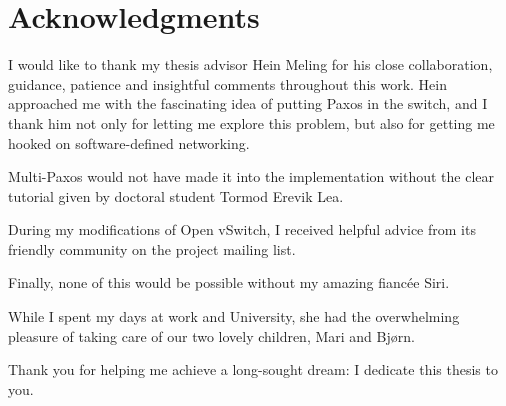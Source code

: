 \cleardoublepage%
\chapter*{Acknowledgments}%
\thispagestyle{empty}%

I would like to thank my thesis advisor Hein Meling for his close
collaboration, guidance, patience and insightful comments throughout this
work.
%
Hein approached me with the fascinating idea of putting Paxos in the
switch, and I thank him not only for letting me explore this problem, but
also for getting me hooked on software-defined networking.

Multi-Paxos would not have made it into the implementation without the
clear tutorial given by doctoral student Tormod Erevik Lea.

During my modifications of Open vSwitch, I received helpful advice from
its friendly community on the project mailing list.

Finally, none of this would be possible without my amazing fiancée Siri.

While I spent my days at work and University, she had the overwhelming
pleasure of taking care of our two lovely children, Mari and Bjørn.

Thank you for helping me achieve a long-sought dream: I dedicate this
thesis to you.
